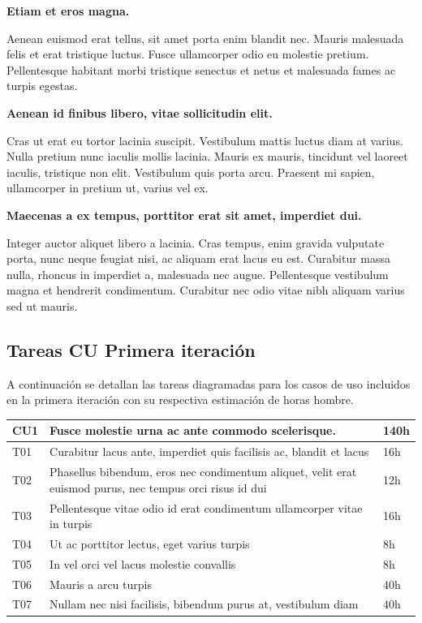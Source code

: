 \documentclass[a4paper, 10pt, twoside]{article}
\begin{document}
\textbf{Etiam et eros magna.}

Aenean euismod erat tellus, sit amet porta enim blandit nec. Mauris malesuada felis et erat tristique luctus. Fusce ullamcorper odio eu molestie pretium. Pellentesque habitant morbi tristique senectus et netus et malesuada fames ac turpis egestas.


\textbf{Aenean id finibus libero, vitae sollicitudin elit.}

Cras ut erat eu tortor lacinia suscipit. Vestibulum mattis luctus diam at varius. Nulla pretium nunc iaculis mollis lacinia. Mauris ex mauris, tincidunt vel laoreet iaculis, tristique non elit. Vestibulum quis porta arcu. Praesent mi sapien, ullamcorper in pretium ut, varius vel ex.

\textbf{Maecenas a ex tempus, porttitor erat sit amet, imperdiet dui.}

Integer auctor aliquet libero a lacinia. Cras tempus, enim gravida vulputate porta, nunc neque feugiat nisi, ac aliquam erat lacus eu est. Curabitur massa nulla, rhoncus in imperdiet a, malesuada nec augue. Pellentesque vestibulum magna et hendrerit condimentum. Curabitur nec odio vitae nibh aliquam varius sed ut mauris.

\subsection{Tareas CU Primera iteración}
A continuación se detallan las tareas diagramadas para los casos de uso incluidos en la primera iteración con su respectiva estimación de horas hombre.
\\

\begin{tabular}{lp{13cm}l}
  \hline
  CU1 & Fusce molestie urna ac ante commodo scelerisque. & 140h \\
  \hline
  T01 & Curabitur lacus ante, imperdiet quis facilisis ac, blandit et lacus & 16h \\
  T02 & Phasellus bibendum, eros nec condimentum aliquet, velit erat euismod purus, nec tempus orci risus id dui & 12h \\
  T03 & Pellentesque vitae odio id erat condimentum ullamcorper vitae in turpis & 16h \\
  T04 & Ut ac porttitor lectus, eget varius turpis & 8h \\
  T05 & In vel orci vel lacus molestie convallis & 8h \\
  T06 & Mauris a arcu turpis & 40h\\
  T07 & Nullam nec nisi facilisis, bibendum purus at, vestibulum diam & 40h \\
  \hline
\end{tabular}
\end{document}
